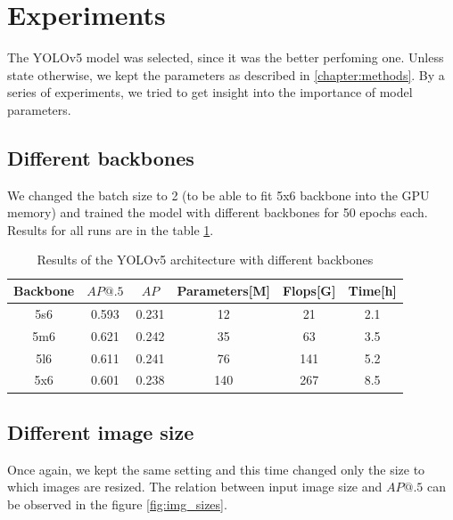 \section{Experiments}
The YOLOv5 model was selected, since it was the better perfoming one. Unless state otherwise, we kept the parameters as described in \ref{chapter:methods}. By a series of experiments, we tried to get insight into the importance of model parameters.
\subsection{Different backbones}
We changed the batch size to 2 (to be able to fit 5x6 backbone into the GPU memory) and trained the model with different backbones for 50 epochs each. Results for all runs are in the table \ref{tab:yolov5_backbones}.

\begin{table}
    \begin{tabular}{c|c|c|c|c|c}
        Backbone & $AP@.5$ & $AP$  & Parameters[M] & Flops[G] & Time[h] \\ \hline
        5s6      & 0.593   & 0.231 & 12            & 21       & 2.1     \\ \hline
        5m6      & 0.621   & 0.242 & 35            & 63       & 3.5     \\ \hline
        5l6      & 0.611   & 0.241 & 76            & 141      & 5.2     \\ \hline
        5x6      & 0.601   & 0.238 & 140           & 267      & 8.5     \\
    \end{tabular}
    \caption{Results of the YOLOv5 architecture with different backbones}
    \label{tab:yolov5_backbones}
\end{table}

\subsection{Different image size}
Once again, we kept the same setting and this time changed only the size to which images are resized. The relation between input image size and $AP@.5$ can be observed in the figure \ref{fig:img_sizes}.

